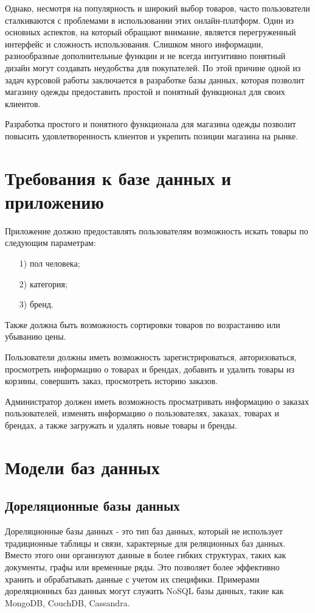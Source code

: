 \documentclass{bmstu}
\begin{document}
Однако, несмотря на популярность и широкий выбор товаров, часто пользователи сталкиваются с проблемами в использовании этих онлайн-платформ. Один из основных аспектов, на который обращают внимание, является перегруженный интерфейс и сложность использования. Слишком много информации, разнообразные дополнительные функции и не всегда интуитивно понятный дизайн могут создавать неудобства для покупателей. По этой причине одной из задач курсовой работы заключается в разработке базы данных, которая позволит магазину одежды предоставить простой и понятный функционал для своих клиентов.

Разработка простого и понятного функционала для магазина одежды позволит повысить удовлетворенность клиентов и укрепить позиции магазина на рынке.

\section{Требования к базе данных и приложению}

Приложение должно предоставлять пользователям возможность искать товары по следующим параметрам:
\begin{enumerate}
	\item[1)] пол человека;
	\item[2)] категория;
	\item[3)] бренд.
\end{enumerate}

Также должна быть возможность сортировки товаров по возрастанию или убыванию цены.

Пользователи должны иметь возможность зарегистрироваться, авторизоваться, просмотреть информацию о товарах и брендах, добавить и удалить товары из корзины, совершить заказ, просмотреть историю заказов.

Администратор должен иметь возможность просматривать информацию о заказах пользователей, изменять информацию о пользователях, заказах, товарах и брендах, а также загружать и удалять новые товары и бренды.

\section{Модели баз данных}

\subsection{Дореляционные базы данных}

Дореляционные базы данных - это тип баз данных, который не использует традиционные таблицы и связи, характерные для реляционных баз данных. Вместо этого они организуют данные в более гибких структурах, таких как документы, графы или временные ряды. Это позволяет более эффективно хранить и обрабатывать данные с учетом их специфики. Примерами дореляционных баз данных могут служить NoSQL базы данных, такие как MongoDB, CouchDB, Cassandra.
\end{document}

